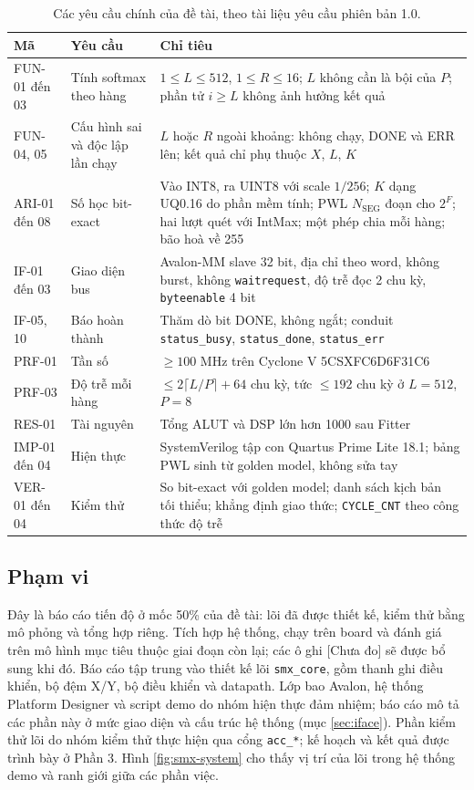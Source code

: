 \begin{table}[htbp]
\centering
\small
\begin{tabular}{p{2.0cm}p{5.2cm}p{6.6cm}}
\toprule
Mã & Yêu cầu & Chỉ tiêu \\
\midrule
FUN-01 đến 03 & Tính softmax theo hàng & $1 \le L \le 512$, $1 \le R \le 16$; $L$ không cần là bội của $P$; phần tử $i \ge L$ không ảnh hưởng kết quả \\
FUN-04, 05 & Cấu hình sai và độc lập lần chạy & $L$ hoặc $R$ ngoài khoảng: không chạy, DONE và ERR lên; kết quả chỉ phụ thuộc $X$, $L$, $K$ \\
ARI-01 đến 08 & Số học bit-exact & Vào INT8, ra UINT8 với scale $1/256$; $K$ dạng UQ0.16 do phần mềm tính; PWL $N_{\text{SEG}}$ đoạn cho $2^F$; hai lượt quét với IntMax; một phép chia mỗi hàng; bão hoà về 255 \\
IF-01 đến 03 & Giao diện bus & Avalon-MM slave 32 bit, địa chỉ theo word, không burst, không \texttt{waitrequest}, độ trễ đọc 2 chu kỳ, \texttt{byteenable} 4 bit \\
IF-05, 10 & Báo hoàn thành & Thăm dò bit DONE, không ngắt; conduit \texttt{status\_busy}, \texttt{status\_done}, \texttt{status\_err} \\
PRF-01 & Tần số & $\ge 100$ MHz trên Cyclone V 5CSXFC6D6F31C6 \\
PRF-03 & Độ trễ mỗi hàng & $\le 2\lceil L/P \rceil + 64$ chu kỳ, tức $\le 192$ chu kỳ ở $L = 512$, $P = 8$ \\
RES-01 & Tài nguyên & Tổng ALUT và DSP lớn hơn 1000 sau Fitter \\
IMP-01 đến 04 & Hiện thực & SystemVerilog tập con Quartus Prime Lite 18.1; bảng PWL sinh từ golden model, không sửa tay \\
VER-01 đến 04 & Kiểm thử & So bit-exact với golden model; danh sách kịch bản tối thiểu; khẳng định giao thức; \texttt{CYCLE\_CNT} theo công thức độ trễ \\
\bottomrule
\end{tabular}
\caption{Các yêu cầu chính của đề tài, theo tài liệu yêu cầu phiên bản 1.0.}
\label{tab:req}
\end{table}

\subsection{Phạm vi}

Đây là báo cáo tiến độ ở mốc 50\% của đề tài: lõi đã được thiết kế, kiểm thử bằng mô phỏng và tổng hợp riêng. Tích hợp hệ thống, chạy trên board và đánh giá trên mô hình mục tiêu thuộc giai đoạn còn lại; các ô ghi [Chưa đo] sẽ được bổ sung khi đó. Báo cáo tập trung vào thiết kế lõi \texttt{smx\_core}, gồm thanh ghi điều khiển, bộ đệm X/Y, bộ điều khiển và datapath. Lớp bao Avalon, hệ thống Platform Designer và script demo do nhóm hiện thực đảm nhiệm; báo cáo mô tả các phần này ở mức giao diện và cấu trúc hệ thống (mục \ref{sec:iface}). Phần kiểm thử lõi do nhóm kiểm thử thực hiện qua cổng \texttt{acc\_*}; kế hoạch và kết quả được trình bày ở Phần 3. Hình \ref{fig:smx-system} cho thấy vị trí của lõi trong hệ thống demo và ranh giới giữa các phần việc.

